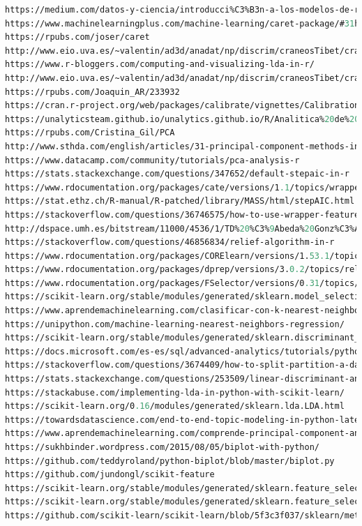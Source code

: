 \documentclass{article}
\begin{document}
\begin{lstlisting}[breaklines, frame = none, basicstyle=\footnotesize,
language = lisp]
https://medium.com/datos-y-ciencia/introducci%C3%B3n-a-los-modelos-de-regresi%C3%B3n-en-r-6ef5a4c47a8f
https://www.machinelearningplus.com/machine-learning/caret-package/#31howtosplitthedatasetintotrainingandvalidation
https://rpubs.com/joser/caret
http://www.eio.uva.es/~valentin/ad3d/anadat/np/discrim/craneosTibet/craneosTibet_practicas-r.pdf
https://www.r-bloggers.com/computing-and-visualizing-lda-in-r/
http://www.eio.uva.es/~valentin/ad3d/anadat/np/discrim/craneosTibet/craneosTibet_practicas-r.pdf
https://rpubs.com/Joaquin_AR/233932
https://cran.r-project.org/web/packages/calibrate/vignettes/CalibrationGuide.pdf
https://unalyticsteam.github.io/unalytics.github.io/R/Analitica%20de%20datos/02/Reescalar,_normalizar__y_variables_indicadoras.html
https://rpubs.com/Cristina_Gil/PCA
http://www.sthda.com/english/articles/31-principal-component-methods-in-r-practical-guide/118-principal-component-analysis-in-r-prcomp-vs-princomp/
https://www.datacamp.com/community/tutorials/pca-analysis-r
https://stats.stackexchange.com/questions/347652/default-stepaic-in-r
https://www.rdocumentation.org/packages/cate/versions/1.1/topics/wrapper
https://stat.ethz.ch/R-manual/R-patched/library/MASS/html/stepAIC.html
https://stackoverflow.com/questions/36746575/how-to-use-wrapper-feature-selection-algorithms-in-r
http://dspace.umh.es/bitstream/11000/4536/1/TD%20%C3%9Abeda%20Gonz%C3%A1lez%2C%20David.pdf
https://stackoverflow.com/questions/46856834/relief-algorithm-in-r
https://www.rdocumentation.org/packages/CORElearn/versions/1.53.1/topics/attrEval
https://www.rdocumentation.org/packages/dprep/versions/3.0.2/topics/relief
https://www.rdocumentation.org/packages/FSelector/versions/0.31/topics/relief
https://scikit-learn.org/stable/modules/generated/sklearn.model_selection.cross_validate.html
https://www.aprendemachinelearning.com/clasificar-con-k-nearest-neighbor-ejemplo-en-python/
https://unipython.com/machine-learning-nearest-neighbors-regression/
https://scikit-learn.org/stable/modules/generated/sklearn.discriminant_analysis.LinearDiscriminantAnalysis.html
https://docs.microsoft.com/es-es/sql/advanced-analytics/tutorials/python-ski-rental-linear-regression-train-model?view=sql-server-ver15
https://stackoverflow.com/questions/3674409/how-to-split-partition-a-dataset-into-training-and-test-datasets-for-e-g-cros
https://stats.stackexchange.com/questions/253509/linear-discriminant-analysis-biplot
https://stackabuse.com/implementing-lda-in-python-with-scikit-learn/
https://scikit-learn.org/0.16/modules/generated/sklearn.lda.LDA.html
https://towardsdatascience.com/end-to-end-topic-modeling-in-python-latent-dirichlet-allocation-lda-35ce4ed6b3e0
https://www.aprendemachinelearning.com/comprende-principal-component-analysis/
https://sukhbinder.wordpress.com/2015/08/05/biplot-with-python/
https://github.com/teddyroland/python-biplot/blob/master/biplot.py
https://github.com/jundongl/scikit-feature
https://scikit-learn.org/stable/modules/generated/sklearn.feature_selection.RFE.html
https://scikit-learn.org/stable/modules/generated/sklearn.feature_selection.SelectKBest.html
https://github.com/scikit-learn/scikit-learn/blob/5f3c3f037/sklearn/metrics/_classification.py#L1321
\end{lstlisting}
\end{document}
